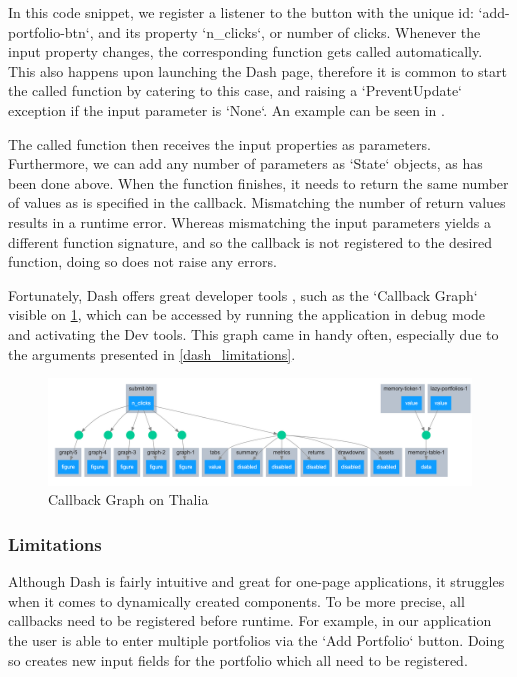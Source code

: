 \documentclass[main.tex]{subfiles}
\begin{document}
In this code snippet, we register a listener to the button with the unique id: `add-portfolio-btn`, and its property `n\_clicks`, or number of clicks. Whenever the input property changes, the corresponding function gets called automatically. This also happens upon launching the Dash page, therefore it is common to start the called function by catering to this case, and raising a `PreventUpdate` exception if the input parameter is `None`. An example can be seen in \cite{prevent_update}.

The called function then receives the input properties as parameters. Furthermore, we can add any number of parameters as `State` objects, as has been done above. When the function finishes, it needs to return the same number of values as is specified in the callback. Mismatching the number of return values results in a runtime error. Whereas mismatching the input parameters yields a different function signature, and so the callback is not registered to the desired function, doing so does not raise any errors. 

Fortunately, Dash offers great developer tools \cite{dash_dev_tools}, such as the `Callback Graph` visible on \figurename{\ref{callback_graph}}, which can be accessed by running the application in debug mode and activating the Dev tools. This graph came in handy often, especially due to the arguments presented in \ref{dash_limitations}.

 \begin{figure}[H]
   \centering
   \includegraphics[scale=0.6]{05Coding/05Pictures/callback_graph.png}
   \caption{Callback Graph on Thalia}
   \label{callback_graph}
\end{figure}


\subsubsection*{Limitations}
\label{dash_limitations}

Although Dash is fairly intuitive and great for one-page applications, it struggles when it comes to dynamically created components. To be more precise, all callbacks need to be registered before runtime. For example, in our application the user is able to enter multiple portfolios via the `Add Portfolio` button. Doing so creates new input fields for the portfolio which all need to be registered. 
\end{document}
